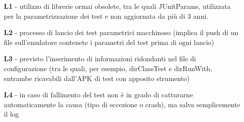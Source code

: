 \begin{itemize}[nosep]
  \item [\textbf{L1} -] utilizzo di librerie ormai obsolete, tra le quali JUnitParams, utilizzata per la parametrizzazione dei test e non aggiornata da più di 3 anni.
  \item [\textbf{L2} -] processo di lancio dei test parametrici macchinoso (implica il push di un file sull'emulatore contenete i parametri del test prima di ogni lancio)
  \item [\textbf{L3} -] previsto l'inserimento di informazioni ridondanti nel file di configurazione (tra le quali, per esempio, dirClassTest e dirRunWith, entrambe ricavabili dall'APK di test con apposito strumento) 
    \item  [\textbf{L4} -] in caso di fallimento del test non è in grado di catturarne automaticamente la causa  (tipo di eccezione o crash), ma salva semplicemente il log 
\end{itemize}


























